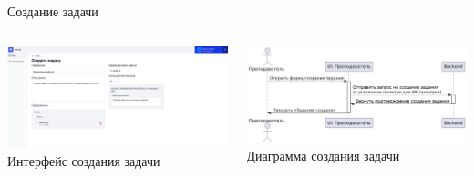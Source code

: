 \documentclass[aspectratio=169]{beamer}
\begin{document}
\begin{frame}{Создание задачи}
\vspace{0.5em}

\begin{columns}
    \begin{column}{0.5\textwidth}
        \centering
        \includegraphics[width=0.95\linewidth]{static/TaskCreate.png} \\
        \small Интерфейс создания задачи
    \end{column}
    \begin{column}{0.5\textwidth}
        \centering
        \includegraphics[width=0.95\linewidth]{static/TaskCreateDiagram.png} \\
        \small Диаграмма создания задачи
    \end{column}
\end{columns}
\end{frame}
\end{document}
